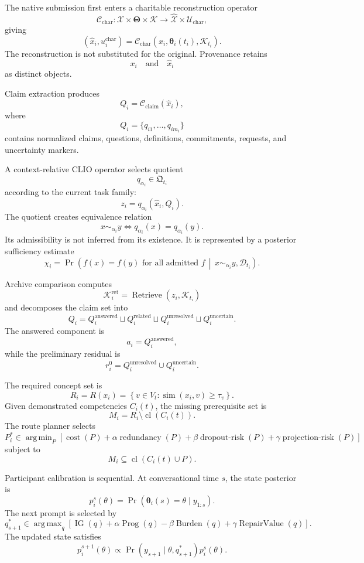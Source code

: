 \documentclass[11pt]{article}
\theoremstyle{definition}
\DeclareMathOperator{\argmin}{arg\,min}
\DeclareMathOperator{\argmax}{arg\,max}
\DeclareMathOperator{\Prob}{Pr}
\DeclareMathOperator{\IG}{IG}
\DeclareMathOperator{\Prog}{Prog}
\DeclareMathOperator{\Burden}{Burden}
\DeclareMathOperator{\closure}{cl}
\newcommand{\K}{\mathcal{K}}
\newcommand{\ThetaSpace}{\boldsymbol{\Theta}}
\newcommand{\thetaState}{\boldsymbol{\theta}}
\newcommand{\given}{\,\middle|\,}
\begin{document}
The native submission first enters a charitable reconstruction operator
\[
\mathcal{C}_{\mathrm{char}}:
\mathcal{X}\times\ThetaSpace\times\K
\to
\widehat{\mathcal{X}}\times\mathcal{U}_{\mathrm{char}},
\]
giving
\[
\left(
\widehat x_i,
u_i^{\mathrm{char}}
\right)
=
\mathcal{C}_{\mathrm{char}}
\left(
x_i,
\thetaState_i(t_i),
\K_{t_i}
\right).
\]
The reconstruction is not substituted for the original. Provenance retains
\[
x_i
\quad\text{and}\quad
\widehat x_i
\]
as distinct objects.

Claim extraction produces
\[
Q_i
=
\mathcal{C}_{\mathrm{claim}}(\widehat x_i),
\]
where
\[
Q_i
=
\{q_{i1},\ldots,q_{im_i}\}
\]
contains normalized claims, questions, definitions, commitments, requests, and uncertainty markers.

A context-relative CLIO operator selects quotient
\[
q_{\alpha_i}
\in
\mathfrak{Q}_{t_i}
\]
according to the current task family:
\[
z_i
=
q_{\alpha_i}
\left(
\widehat x_i,Q_i
\right).
\]
The quotient creates equivalence relation
\[
x\sim_{\alpha_i}y
\iff
q_{\alpha_i}(x)=q_{\alpha_i}(y).
\]
Its admissibility is not inferred from its existence. It is represented by a posterior sufficiency estimate
\[
\chi_i
=
\Prob\!\left(
f(x)=f(y)
\text{ for all admitted }f
\given
x\sim_{\alpha_i}y,\mathcal{D}_{t_i}
\right).
\]

Archive comparison computes
\[
\mathcal{K}_{i}^{\mathrm{ret}}
=
\operatorname{Retrieve}
\left(
z_i,
\K_{t_i}
\right)
\]
and decomposes the claim set into
\[
Q_i
=
Q_i^{\mathrm{answered}}
\sqcup
Q_i^{\mathrm{related}}
\sqcup
Q_i^{\mathrm{unresolved}}
\sqcup
Q_i^{\mathrm{uncertain}}.
\]
The answered component is
\[
a_i
=
Q_i^{\mathrm{answered}},
\]
while the preliminary residual is
\[
r_i^{0}
=
Q_i^{\mathrm{unresolved}}
\cup
Q_i^{\mathrm{uncertain}}.
\]

The required concept set is
\[
R_i
=
R(x_i)
=
\left\{
v\in V_t:
\operatorname{sim}(x_i,v)\geq\tau_v
\right\}.
\]
Given demonstrated competencies \(C_i(t)\), the missing prerequisite set is
\[
M_i
=
R_i
\setminus
\closure(C_i(t)).
\]
The route planner selects
\[
P_i^{*}
\in
\argmin_{P}
\left[
\operatorname{cost}(P)
+
\alpha\operatorname{redundancy}(P)
+
\beta\operatorname{dropout\text{-}risk}(P)
+
\gamma\operatorname{projection\text{-}risk}(P)
\right]
\]
subject to
\[
M_i
\subseteq
\closure(C_i(t)\cup P).
\]

Participant calibration is sequential. At conversational time \(s\), the state posterior is
\[
p_i^{s}(\theta)
=
\Prob(
\thetaState_i(s)=\theta
\mid
y_{1:s}
).
\]
The next prompt is selected by
\[
q_{s+1}^{*}
\in
\argmax_q
\left[
\IG(q)
+
\alpha\Prog(q)
-
\beta\Burden(q)
+
\gamma\operatorname{RepairValue}(q)
\right].
\]
The updated state satisfies
\[
p_i^{s+1}(\theta)
\propto
\Prob(
y_{s+1}\mid\theta,q_{s+1}^{*}
)
p_i^{s}(\theta).
\]
\end{document}
